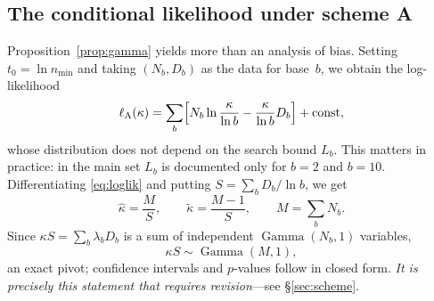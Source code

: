 \documentclass[11pt,a4paper]{article}
\theoremstyle{plain}
\theoremstyle{remark}
\DeclareMathOperator{\Gam}{Gamma}
\begin{document}
\subsection{The conditional likelihood under scheme A}\label{sec:condlik}

Proposition~\ref{prop:gamma} yields more than an analysis of bias. Setting
$t_0=\ln n_{\min}$ and taking $(N_b,D_b)$ as the data for base~$b$, we obtain
the log-likelihood
\begin{equation}\label{eq:loglik}
\ell_{\mathrm A}(\kappa)=\sum_b\Bigl[N_b\ln\frac{\kappa}{\ln b}-\frac{\kappa}{\ln b}D_b\Bigr]+\mathrm{const},
\end{equation}
whose distribution does not depend on the search bound $L_b$. This matters in
practice: in the main set $L_b$ is documented only for $b=2$ and $b=10$.
Differentiating
\eqref{eq:loglik} and putting $S=\sum_b D_b/\ln b$, we get
\begin{equation}\label{eq:mle}
\hat\kappa=\frac{M}{S},\qquad \tilde\kappa=\frac{M-1}{S},\qquad M=\sum_b N_b .
\end{equation}
Since $\kappa S=\sum_b\lambda_bD_b$ is a sum of independent $\Gam(N_b,1)$
variables,
\begin{equation}\label{eq:pivot}
\kappa S\sim\Gam(M,1),
\end{equation}
an exact pivot; confidence intervals and $p$-values follow in closed form.
\emph{It is precisely this statement that requires revision}---see
\S\ref{sec:scheme}.
\end{document}
